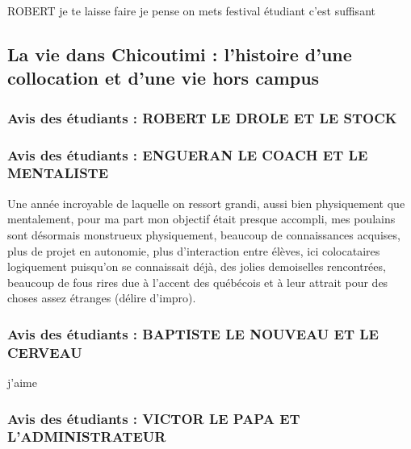 ROBERT je te laisse faire je pense on mets festival étudiant c'est suffisant 

\subsection{La vie dans Chicoutimi : l'histoire d'une collocation et d'une vie hors campus}

\subsubsection{Avis des étudiants : ROBERT LE DROLE ET LE STOCK}
\subsubsection{Avis des étudiants : ENGUERAN LE COACH ET LE MENTALISTE}

Une année incroyable de laquelle on ressort grandi, aussi bien physiquement que mentalement, pour ma part mon objectif était presque accompli, mes poulains sont désormais monstrueux physiquement, beaucoup de connaissances acquises, plus de projet en autonomie, plus d’interaction entre élèves, ici colocataires logiquement puisqu’on se connaissait déjà, des jolies demoiselles rencontrées, beaucoup de fous rires due à l’accent des québécois et à leur attrait pour des choses assez étranges (délire d’impro). 

\subsubsection{Avis des étudiants : BAPTISTE LE NOUVEAU ET LE CERVEAU}
j'aime
\subsubsection{Avis des étudiants : VICTOR LE PAPA ET L'ADMINISTRATEUR}


